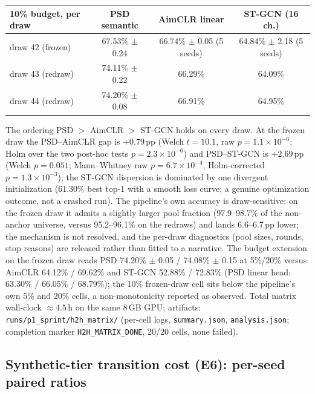 \documentclass[11pt,a4paper]{article}
\begin{document}
\begin{center}
\footnotesize
\begin{tabular}{lccc}
\toprule
10\% budget, per draw & PSD semantic & AimCLR linear & ST-GCN (16 ch.) \\
\midrule
draw 42 (frozen) & 67.53\% $\pm$ 0.24 & 66.74\% $\pm$ 0.05 (5 seeds) & 64.84\% $\pm$ 2.18 (5 seeds) \\
draw 43 (redraw) & 74.11\% $\pm$ 0.22 & 66.29\% & 64.09\% \\
draw 44 (redraw) & 74.20\% $\pm$ 0.08 & 66.91\% & 64.95\% \\
\bottomrule
\end{tabular}
\end{center}
The ordering PSD $>$ AimCLR $>$ ST-GCN holds on every draw. At the frozen draw the PSD--AimCLR gap is $+0.79$\,pp (Welch $t{=}10.1$, raw $p{=}1.1\times10^{-6}$; Holm over the two post-hoc tests $p{=}2.3\times10^{-6}$) and PSD--ST-GCN is $+2.69$\,pp (Welch $p{=}0.051$; Mann--Whitney raw $p{=}6.7\times10^{-4}$, Holm-corrected $p{=}1.3\times10^{-3}$); the ST-GCN dispersion is dominated by one divergent initialization (61.30\% best top-1 with a smooth loss curve; a genuine optimization outcome, not a crashed run). The pipeline's own accuracy is draw-sensitive: on the frozen draw it admits a slightly larger pool fraction (97.9--98.7\% of the non-anchor universe, versus 95.2--96.1\% on the redraws) and lands 6.6--6.7\,pp lower; the mechanism is not resolved, and the per-draw diagnostics (pool sizes, rounds, stop reasons) are released rather than fitted to a narrative. The budget extension on the frozen draw reads PSD 74.20\% $\pm$ 0.05 / 74.08\% $\pm$ 0.15 at 5\%/20\% versus AimCLR 64.12\% / 69.62\% and ST-GCN 52.88\% / 72.83\% (PSD linear head: 63.30\% / 66.05\% / 68.79\%); the 10\% frozen-draw cell sits below the pipeline's own 5\% and 20\% cells, a non-monotonicity reported as observed. Total matrix wall-clock ${\approx}4.5$\,h on the same 8\,GB GPU; artifacts: \texttt{runs/p1\_sprint/h2h\_matrix/} (per-cell logs, \texttt{summary.json}, \texttt{analysis.json}; completion marker \texttt{H2H\_MATRIX\_DONE}, 20/20 cells, none failed).

\subsection{Synthetic-tier transition cost (E6): per-seed paired ratios}\label{app:e6seeds}
\end{document}
